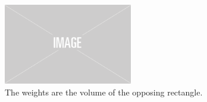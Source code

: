 

\begin{figure}
    \centering
    \includegraphics[width=0.5\textwidth]{figures/img-placeholder.png}
    \caption{The weights are the volume of the opposing rectangle.}
    \label{fig:bilinear}
\end{figure}



